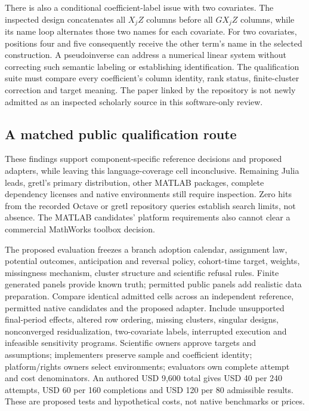 There is also a conditional coefficient-label issue with two covariates.
The inspected design concatenates all $X_jZ$ columns before all $GX_jZ$
columns, while its name loop alternates those two names for each covariate.
For two covariates, positions four and five consequently receive the other
term's name in the selected construction. A pseudoinverse can address a
numerical linear system without correcting such semantic labeling or
establishing identification. The qualification suite must compare every
coefficient's column identity, rank status, finite-cluster correction and
target meaning. The paper linked by the repository is not newly admitted
as an inspected scholarly source in this software-only review.
\citep{exec25_panelother_matlab,exec25_panelother_choice}

\subsection{A matched public qualification route}
These findings support component-specific reference decisions and proposed
adapters, while leaving this language-coverage cell inconclusive. Remaining
Julia leads, gretl's primary distribution, other MATLAB packages, complete
dependency licenses and native environments still require inspection.
Zero hits from the recorded Octave or gretl repository queries establish
search limits, not absence. The MATLAB candidates' platform requirements
also cannot clear a commercial MathWorks toolbox decision.
\citep{exec25_panelother_choice}

The proposed evaluation freezes a branch adoption calendar, assignment law,
potential outcomes, anticipation and reversal policy, cohort-time target,
weights, missingness mechanism, cluster structure and scientific refusal
rules. Finite generated panels provide known truth; permitted public panels
add realistic data preparation. Compare identical admitted cells across
an independent reference, permitted native candidates and the proposed
adapter. Include unsupported final-period effects, altered row ordering,
missing clusters, singular designs, nonconverged residualization, two-covariate
labels, interrupted execution and infeasible sensitivity programs.
Scientific owners approve targets and assumptions; implementers preserve
sample and coefficient identity; platform/rights owners select environments;
evaluators own complete attempt and cost denominators. An authored USD 9,600
total gives USD 40 per 240 attempts, USD 60 per 160 completions and USD 120
per 80 admissible results. These are proposed tests and hypothetical costs,
not native benchmarks or prices.\citep{exec25_panelother_choice}
